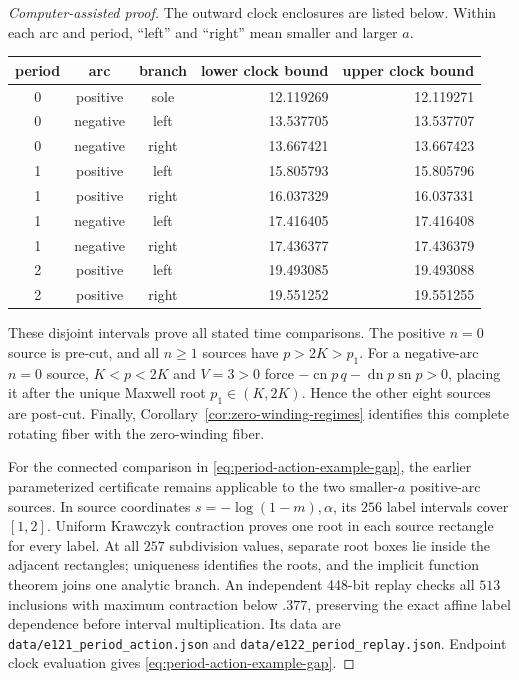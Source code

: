 \documentclass[11pt,a4paper]{article}
\theoremstyle{remark}\newtheorem{remark}[theorem]{Remark}
\newcommand{\sn}{\operatorname{sn}}
\newcommand{\cn}{\operatorname{cn}}
\newcommand{\dn}{\operatorname{dn}}
\begin{document}
\begin{proof}[Computer-assisted proof]
The outward clock enclosures are listed below. Within each arc and period,
``left'' and ``right'' mean smaller and larger $a$.
\begin{center}\small
\begin{tabular}{cccrr}
\toprule
period & arc & branch & lower clock bound & upper clock bound\\
\midrule
0 & positive & sole  & 12.119269 & 12.119271\\
0 & negative & left  & 13.537705 & 13.537707\\
0 & negative & right & 13.667421 & 13.667423\\
1 & positive & left  & 15.805793 & 15.805796\\
1 & positive & right & 16.037329 & 16.037331\\
1 & negative & left  & 17.416405 & 17.416408\\
1 & negative & right & 17.436377 & 17.436379\\
2 & positive & left  & 19.493085 & 19.493088\\
2 & positive & right & 19.551252 & 19.551255\\
\bottomrule
\end{tabular}
\end{center}
These disjoint intervals prove all stated time comparisons. The positive
$n=0$ source is pre-cut, and all $n\ge1$ sources have $p>2K>p_1$.
For a negative-arc $n=0$ source, $K<p<2K$ and $V=3>0$ force
$-\cn p\,q-\dn p\sn p>0$, placing it after the unique Maxwell root
$p_1\in(K,2K)$. Hence the other eight sources are post-cut. Finally,
Corollary~\ref{cor:zero-winding-regimes} identifies this complete rotating
fiber with the zero-winding fiber.

For the connected comparison in \eqref{eq:period-action-example-gap},
the earlier parameterized certificate remains applicable to the two
smaller-$a$ positive-arc sources. In source coordinates
$s=-\log(1-m),\alpha$, its $256$ label intervals cover $[1,2]$.
Uniform Krawczyk contraction proves one root in each source rectangle
for every label. At all $257$ subdivision values, separate root boxes
lie inside the adjacent rectangles; uniqueness identifies the roots,
and the implicit function theorem joins one analytic branch. An independent
448-bit replay checks all $513$ inclusions with maximum contraction below
$.377$, preserving the exact affine label dependence before interval
multiplication. Its data are \nolinkurl{data/e121_period_action.json}
and \nolinkurl{data/e122_period_replay.json}. Endpoint clock evaluation
gives \eqref{eq:period-action-example-gap}.
\end{proof}
\end{document}
